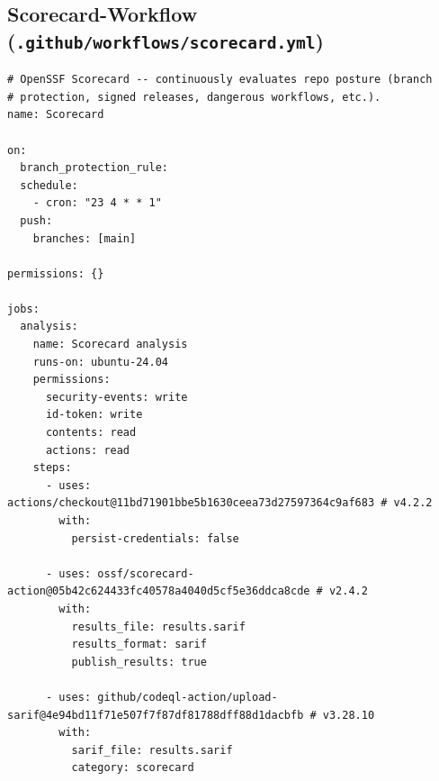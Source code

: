 \documentclass[12pt, a4paper]{scrartcl}
\begin{document}
\subsection{Scorecard-Workflow (\texttt{.github/workflows/scorecard.yml})}
\begin{lstlisting}
# OpenSSF Scorecard -- continuously evaluates repo posture (branch
# protection, signed releases, dangerous workflows, etc.).
name: Scorecard

on:
  branch_protection_rule:
  schedule:
    - cron: "23 4 * * 1"
  push:
    branches: [main]

permissions: {}

jobs:
  analysis:
    name: Scorecard analysis
    runs-on: ubuntu-24.04
    permissions:
      security-events: write
      id-token: write
      contents: read
      actions: read
    steps:
      - uses: actions/checkout@11bd71901bbe5b1630ceea73d27597364c9af683 # v4.2.2
        with:
          persist-credentials: false

      - uses: ossf/scorecard-action@05b42c624433fc40578a4040d5cf5e36ddca8cde # v2.4.2
        with:
          results_file: results.sarif
          results_format: sarif
          publish_results: true

      - uses: github/codeql-action/upload-sarif@4e94bd11f71e507f7f87df81788dff88d1dacbfb # v3.28.10
        with:
          sarif_file: results.sarif
          category: scorecard
\end{lstlisting}
\end{document}
